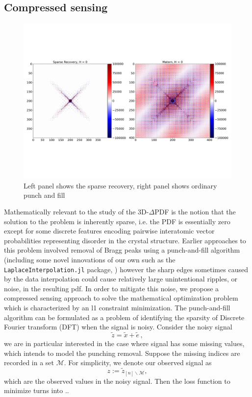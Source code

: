 \documentclass[final,onefignum,onetabnum]{siamart190516}
\begin{document}
\subsection{Compressed sensing}

\begin{figure}
\includegraphics[width=\textwidth, trim=0in 4in 0in 4in 0in]{MaternVsSparse.pdf}
\caption{\label{fig:VO2} Left panel shows the sparse recovery, right panel shows ordinary punch and fill}
\end{figure}

Mathematically relevant to the study of the 3D-$\Delta$PDF is the notion that the
solution to the problem is inherently sparse, i.e. the PDF is essentially zero except
for some discrete features encoding pairwise interatomic vector probabilities
representing disorder in the crystal structure. Earlier approaches to this problem
involved removal of Bragg peaks using a punch-and-fill algorithm (including some
novel innovations of our own such as the \texttt{LaplaceInterpolation.jl} package, \cite{RH2022}) however the sharp edges
sometimes caused by the data interpolation could cause relatively large unintentional
ripples, or noise, in the resulting pdf. In order to mitigate this noise, we propose
a compressed sensing approach to solve the mathematical optimization problem which is characterized by an l1
constraint minimization. The punch-and-fill algorithm can be formulated as a problem of identifying the sparsity of Discrete Fourier transform (DFT) when the signal is noisy. Consider the noisy signal
\begin{equation}
    \widetilde{z} = \widetilde{x} + \widetilde{e}\,,
\end{equation}
we are in particular interested in the case where signal has some missing values, which intends to model the punching removal. Suppose the missing indices are recorded in a set $\mathcal{M}$. For simplicity, we denote our observed signal as
\begin{equation}
    z:=\widetilde{z}_{[n]\backslash\mathcal{M}},
\end{equation}
which are the observed values in the noisy signal. Then the loss function to minimize turns into $.$. 
\end{document}
